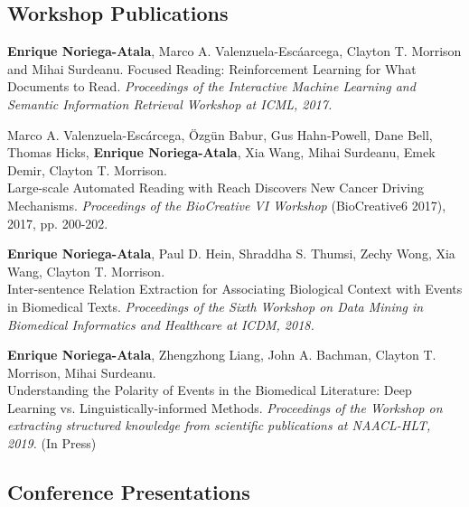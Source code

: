 \documentclass[letterpaper]{article}
\renewenvironment{itemize}{
  \begin{list}{}{
    \setlength{\leftmargin}{1.5em}
  }
}{
  \end{list}
}
\begin{document}
\subsection*{Workshop Publications}
\begin{itemize}
	\item \textbf{Enrique Noriega-Atala}, Marco A. Valenzuela-Esc\'a{a}rcega, Clayton T. Morrison and Mihai Surdeanu. Focused Reading: Reinforcement Learning for What Documents to Read. \textit{Proceedings of the Interactive Machine Learning and Semantic Information Retrieval Workshop at ICML, 2017.}
	\item Marco A. Valenzuela-Esc\'{a}rcega, \"{O}zg\"{u}n Babur, Gus Hahn-Powell, Dane Bell, Thomas Hicks, \textbf{Enrique Noriega-Atala}, Xia Wang, Mihai Surdeanu, Emek Demir, Clayton T. Morrison. \\Large-scale Automated Reading with Reach Discovers New Cancer Driving Mechanisms. \textit{Proceedings of the BioCreative VI Workshop} (BioCreative6 2017), 2017, pp. 200-202.
	\item \textbf{Enrique Noriega-Atala}, Paul D. Hein, Shraddha S. Thumsi, Zechy Wong, Xia Wang, Clayton T. Morrison. \\ Inter-sentence Relation Extraction for Associating Biological Context with Events in Biomedical Texts. \textit{Proceedings of the Sixth Workshop on Data Mining in Biomedical Informatics and Healthcare at ICDM, 2018.}
	\item \textbf{Enrique Noriega-Atala}, Zhengzhong Liang, John A. Bachman, Clayton T. Morrison, Mihai Surdeanu.\\ Understanding the Polarity of Events in the Biomedical Literature: Deep Learning vs. Linguistically-informed Methods. \textit{Proceedings of the Workshop on extracting structured knowledge from scientific publications at NAACL-HLT, 2019.} (In Press) 

\end{itemize}

\subsection*{Conference Presentations}
\end{document}

